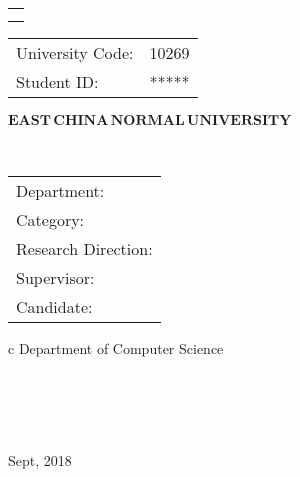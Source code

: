 

\pagestyle{empty}

\begin{flushleft}
	\large
	\renewcommand\arraystretch{1.5}
	\begin{tabular}{l}
		\noindent{\large Dissertation for master degree in 2019}  \\ 
		\noindent{\large  (Professional)}\\ 
	\end{tabular}
\qquad
	\begin{tabular}{lc}
	 University Code:  &  10269  \\ 
 Student ID: &    *****  \\ 
	\end{tabular}
\end{flushleft}

\vskip 2cm

\begin{center}
{\Huge $\mathbf{EAST}\,\mathbf{CHINA}\,\mathbf{NORMAL}\,
\mathbf{UNIVERSITY}$}
\end{center}

\vskip 3cm

\begin{center}
\bfseries{\scshape{\huge \TheisNameEn
}}\\
\end{center}

\vskip 3.5cm {\large
\begin{center}
\begin{tabular}{l}
Department:\\
Category:\\ 
Research Direction:\\
Supervisor:\\
Candidate:
\end{tabular}
\begin{tabular}c
\normalsize{{Department of Computer Science}}\\
\hline ~~~  \\
\hline ~~~\\
\hline ~~~ \\
\hline ~~~  \\

\hline
\end{tabular}
\end{center}}

\vskip 30mm

\begin{center}
{\Large Sept, 2018}
\end{center}
